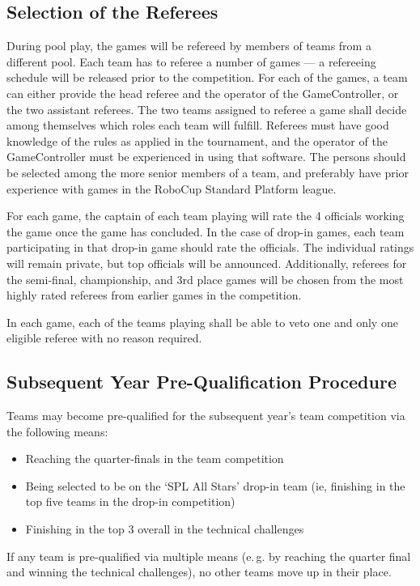 \documentclass[12pt]{article}
\newcommand{\eg}{\mbox{e.\,g.}\xspace}
\begin{document}
\subsection{Selection of the Referees}
\label{sec:refSelection}
During pool play, the games will be refereed by members of teams from a different pool.  Each team has to referee a number of games --- a refereeing schedule will be released prior to the competition. For each of the games, a team can either provide the head referee and the operator of the GameController, or the two assistant referees.  The two teams assigned to referee a game shall decide among themselves which roles each team will fulfill.  Referees must have good knowledge of the rules as applied in the tournament, and the operator of the GameController must be experienced in using that software. The persons should be selected among the more senior members of a team, and preferably have prior experience with games in the RoboCup Standard Platform league.

For each game, the captain of each team playing will rate the 4 officials working the game once the game has concluded.  In the case of drop-in games, each team participating in that drop-in game should rate the officials.  The individual ratings will remain private, but top officials will be announced.  Additionally, referees for the semi-final, championship, and 3rd place games will be chosen from the most highly rated referees from earlier games in the competition.

In each game, each of the teams playing shall be able to veto one and only one eligible referee with no reason required.

\subsection{Subsequent Year Pre-Qualification Procedure}
\label{sec:preQual}
Teams may become pre-qualified for the subsequent year's team competition via the following means:
\begin{itemize}
\item Reaching the quarter-finals in the team competition
\item Being selected to be on the `SPL All Stars' drop-in team (ie, finishing in the top five teams in the drop-in competition)
\item Finishing in the top 3 overall in the technical challenges
\end{itemize}
If any team is pre-qualified via multiple means (\eg by reaching the quarter final and winning the technical challenges), no other teams move up in their place.
\end{document}

